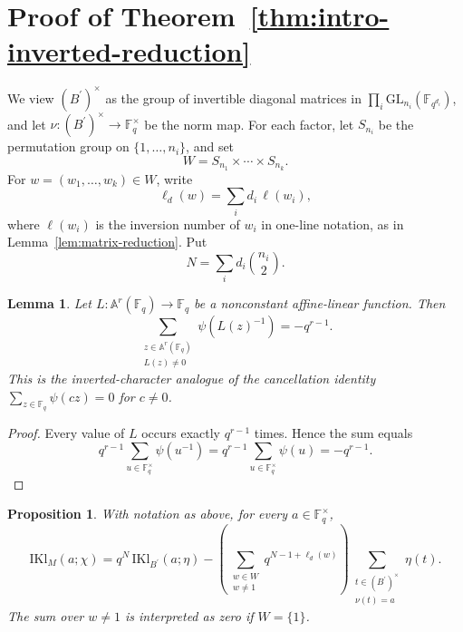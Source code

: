 \documentclass[11pt]{amsart}
\newcommand{\IKl}{\mathrm{IKl}}
\numberwithin{equation}{section}
\theoremstyle{remark}
\theoremstyle{plain}
\newtheorem{lemma}[equation]{Lemma}
\newtheorem{proposition}[equation]{Proposition}
\theoremstyle{definition}
\begin{document}
\section{Proof of Theorem~\ref*{thm:intro-inverted-reduction}}

We view \((B^{\prime})^\times\) as the group of invertible diagonal matrices in
\(\prod_i\mathrm{GL}_{n_i}(\mathbb{F}_{q^{d_i}})\), and let
\(\nu\colon (B^{\prime})^\times\to\mathbb{F}_q^\times\) be the norm map.  For
each factor, let \(S_{n_i}\) be the permutation group on
\(\{1,\ldots,n_i\}\), and set
\[
W=S_{n_1}\times\cdots\times S_{n_k}.
\]
For \(w=(w_1,\ldots,w_k)\in W\), write
\[
\ell_d(w)=\sum_i d_i\,\ell(w_i),
\]
where \(\ell(w_i)\) is the inversion number of \(w_i\) in one-line
notation, as in Lemma~\ref{lem:matrix-reduction}.
Put
\[
N=\sum_i d_i\binom{n_i}{2}.
\]

\begin{lemma}\label{lem:inverted-affine}
Let \(L\colon\mathbb{A}^r(\mathbb{F}_q)\to\mathbb{F}_q\) be a
nonconstant affine-linear function.  Then
\[
\sum_{\substack{z\in\mathbb{A}^r(\mathbb{F}_q)\\L(z)\neq 0}}
\psi(L(z)^{-1})
=
-q^{r-1}.
\]
This is the inverted-character analogue of the cancellation identity
\(\sum_{z\in\mathbb{F}_q}\psi(cz)=0\) for \(c\neq 0\).
\end{lemma}

\begin{proof}
Every value of \(L\) occurs exactly \(q^{r-1}\) times.  Hence the
sum equals
\[
q^{r-1}\sum_{u\in\mathbb{F}_q^\times}\psi(u^{-1})
=
q^{r-1}\sum_{u\in\mathbb{F}_q^\times}\psi(u)
=
-q^{r-1}.
\]
\end{proof}


\begin{proposition}\label{prop:inverted-master}
With notation as above, for every \(a\in\mathbb{F}_q^\times\),
\begin{equation}\label{eq:inverted-master}
\IKl_M(a;\chi)
=
q^N\, \IKl_{B^{\prime}}(a;\eta)
-
\left(\sum_{\substack{w\in W\\ w\neq 1}} q^{N-1+\ell_d(w)}\right)
\sum_{\substack{t\in (B^{\prime})^\times\\ \nu(t)=a}} \eta(t).
\end{equation}
The sum over \(w\neq 1\) is interpreted as zero if \(W=\{1\}\).
\end{proposition}
\end{document}
